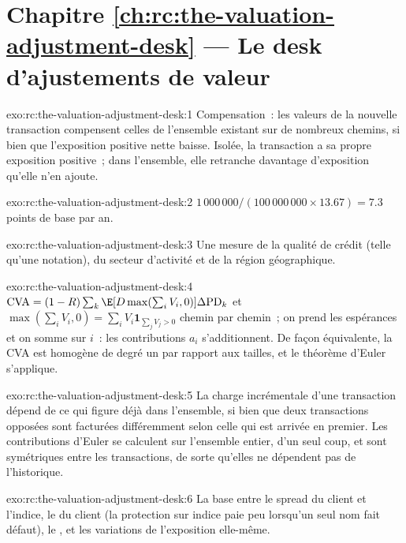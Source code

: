 \section*{Chapitre \ref{ch:rc:the-valuation-adjustment-desk} --- Le desk d'ajustements de valeur}

\begin{solution}{exo:rc:the-valuation-adjustment-desk:1}
Compensation~: les valeurs de la nouvelle transaction compensent celles de l'ensemble existant sur de nombreux chemins, si bien que l'exposition positive nette baisse.
Isolée, la transaction a sa propre exposition positive~; dans l'ensemble, elle retranche
davantage d'exposition qu'elle n'en ajoute.
\end{solution}

\begin{solution}{exo:rc:the-valuation-adjustment-desk:2}
$1\,000\,000/(100\,000\,000\times13.67) = 7.3$ points de base par an.
\end{solution}

\begin{solution}{exo:rc:the-valuation-adjustment-desk:3}
Une mesure de la qualité de crédit (telle qu'une notation), du secteur d'activité et de la région géographique.
\end{solution}

\begin{solution}{exo:rc:the-valuation-adjustment-desk:4}
$\mathrm{CVA} = (1-R)\sum_k\E[D\max(\sum_iV_i,0)]\Delta\mathrm{PD}_k$ et
$\max(\sum_iV_i,0) = \sum_iV_i\mathbf 1_{\sum_jV_j>0}$ chemin par chemin~; on prend les espérances et on somme sur $i$~:
les contributions $a_i$ s'additionnent. De façon équivalente, la CVA est homogène de degré un par rapport aux tailles, et
le théorème d'Euler s'applique.
\end{solution}

\begin{solution}{exo:rc:the-valuation-adjustment-desk:5}
La charge incrémentale d'une transaction dépend de ce qui figure déjà dans l'ensemble, si bien que deux transactions opposées
sont facturées différemment selon celle qui est arrivée en premier. Les contributions d'Euler se calculent sur
l'ensemble entier, d'un seul coup, et sont symétriques entre les transactions, de sorte qu'elles ne dépendent pas de l'historique.
\end{solution}

\begin{solution}{exo:rc:the-valuation-adjustment-desk:6}
La base entre le spread du client et l'indice, le  du client (la protection
sur indice paie peu lorsqu'un seul nom fait défaut), le , et les variations de l'exposition elle-même.
\end{solution}


